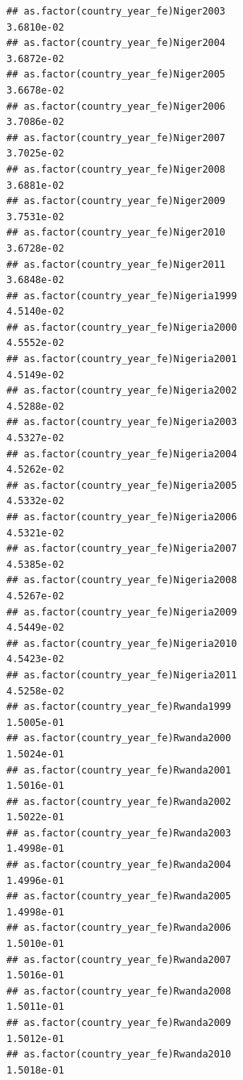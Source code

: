 \documentclass[
  a4paper,
]{article}
\begin{document}
\begin{verbatim}
## as.factor(country_year_fe)Niger2003                             3.6810e-02
## as.factor(country_year_fe)Niger2004                             3.6872e-02
## as.factor(country_year_fe)Niger2005                             3.6678e-02
## as.factor(country_year_fe)Niger2006                             3.7086e-02
## as.factor(country_year_fe)Niger2007                             3.7025e-02
## as.factor(country_year_fe)Niger2008                             3.6881e-02
## as.factor(country_year_fe)Niger2009                             3.7531e-02
## as.factor(country_year_fe)Niger2010                             3.6728e-02
## as.factor(country_year_fe)Niger2011                             3.6848e-02
## as.factor(country_year_fe)Nigeria1999                           4.5140e-02
## as.factor(country_year_fe)Nigeria2000                           4.5552e-02
## as.factor(country_year_fe)Nigeria2001                           4.5149e-02
## as.factor(country_year_fe)Nigeria2002                           4.5288e-02
## as.factor(country_year_fe)Nigeria2003                           4.5327e-02
## as.factor(country_year_fe)Nigeria2004                           4.5262e-02
## as.factor(country_year_fe)Nigeria2005                           4.5332e-02
## as.factor(country_year_fe)Nigeria2006                           4.5321e-02
## as.factor(country_year_fe)Nigeria2007                           4.5385e-02
## as.factor(country_year_fe)Nigeria2008                           4.5267e-02
## as.factor(country_year_fe)Nigeria2009                           4.5449e-02
## as.factor(country_year_fe)Nigeria2010                           4.5423e-02
## as.factor(country_year_fe)Nigeria2011                           4.5258e-02
## as.factor(country_year_fe)Rwanda1999                            1.5005e-01
## as.factor(country_year_fe)Rwanda2000                            1.5024e-01
## as.factor(country_year_fe)Rwanda2001                            1.5016e-01
## as.factor(country_year_fe)Rwanda2002                            1.5022e-01
## as.factor(country_year_fe)Rwanda2003                            1.4998e-01
## as.factor(country_year_fe)Rwanda2004                            1.4996e-01
## as.factor(country_year_fe)Rwanda2005                            1.4998e-01
## as.factor(country_year_fe)Rwanda2006                            1.5010e-01
## as.factor(country_year_fe)Rwanda2007                            1.5016e-01
## as.factor(country_year_fe)Rwanda2008                            1.5011e-01
## as.factor(country_year_fe)Rwanda2009                            1.5012e-01
## as.factor(country_year_fe)Rwanda2010                            1.5018e-01

\end{verbatim}
\end{document}
